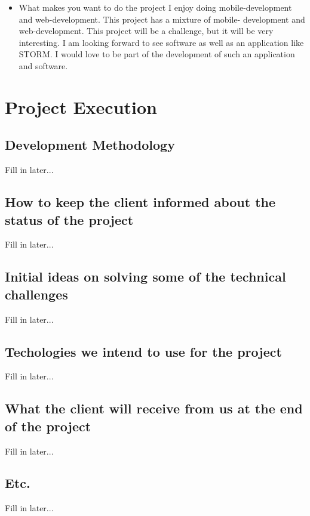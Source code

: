 \documentclass[12pt, oneside]{article}
\begin{document}
\begin{enumerate}
\begin{itemize}
			\item What makes you want to do the project\newline
				I enjoy doing mobile-development and web-development. This project has a mixture of mobile-							development and web-development. This project will be a challenge, but it will be very interesting. I am 						looking forward to see software as well as an application like STORM. I would love to be part of the 							development of such an application and software.
		\end{itemize}
	\end{enumerate}
	
\section{Project Execution}
	\subsection{Development Methodology}
		Fill in later...
	\subsection{How to keep the client informed about the status of the project}
		Fill in later...
	\subsection{Initial ideas on solving some of the technical challenges}
		Fill in later...
	\subsection{Techologies we intend to use for the project}
		Fill in later...
	\subsection{What the client will receive from us at the end of the project}
		Fill in later...
	\subsection{Etc.}
		Fill in later...
\end{document}
